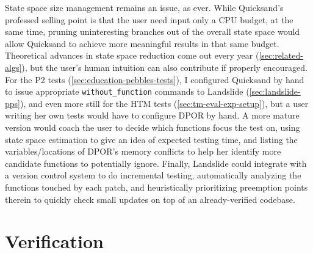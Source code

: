 State space size management remains an issue, as ever.
While Quicksand's professed selling point is that the user need input only a CPU budget,
at the same time,
pruning uninteresting branches out of the overall state space
would allow Quicksand to achieve more meaningful results in that same budget.
Theoretical advances in state space reduction come out every year (\cref{sec:related-algs}),
but the user's human intuition can also contribute if properly encouraged.
For the P2 tests (\cref{sec:education-pebbles-tests}),
I configured Quicksand by hand to issue appropriate {\tt without\_function} commands to Landslide
(\cref{sec:landslide-pps}),
and even more still for the HTM tests (\cref{sec:tm-eval-exp-setup}),
but a user writing her own tests would have to configure DPOR by hand.
A more mature version would coach the user to decide which functions focus the test on,
using state space estimation to give an idea of expected testing time,
and listing the variables/locations of DPOR's memory conflicts
to help her identify more candidate functions to potentially ignore.
Finally, Landslide could integrate with a version control system to do incremental testing,
automatically analyzing the functions touched by each patch,
and heuristically prioritizing preemption points therein
to quickly check small updates on top of an already-verified codebase.

\section{Verification}
\label{sec:warpzone-verif}

